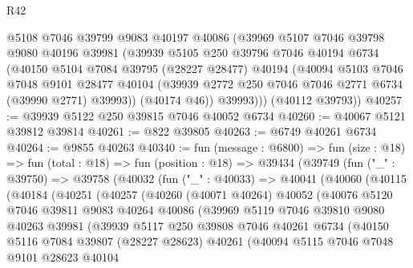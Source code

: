 \begin{lexlean}{R42}
\begin{coremodule}
{        @5108
        @7046
        @39799
        @9083
        @40197
        @40086
        (@39969
          @5107
          @7046
          @39798
          @9080
          @40196
          @39981
          (@39939
            @5105
            @250
            @39796
            @7046
            @40194
            @6734
            (@40150
              @5104
              @7084
              @39795
              (@28227 @28477)
              @40194
              (@40094
                @5103
                @7046
                @7048
                @9101
                @28477
                @40104
                (@39939 @2772 @250 @7046 @7046 @2771 @6734 (@39990 @2771) @39993))
              (@40174 @46))
            @39993)))
      (@40112 @39793))
@40257 := @39939 @5122 @250 @39815 @7046 @40052 @6734
@40260 := @40067 @5121 @39812 @39814
@40261 := @822 @39805
@40263 := @6749 @40261 @6734
@40264 := @9855 @40263
@40340 := fun (message : @6800) =>
  fun (size : @18) =>
  fun (total : @18) =>
  fun (position : @18) =>
  @39434
    (@39749
      (fun ("_" : @39750) =>
      @39758
        (@40032
          (fun ("_" : @40033) =>
          @40041
            (@40060
              (@40115
                (@40184
                  (@40251
                    (@40257
                      (@40260
                        (@40071 @40264)
                        @40052
                        (@40076
                          @5120
                          @7046
                          @39811
                          @9083
                          @40264
                          @40086
                          (@39969
                            @5119
                            @7046
                            @39810
                            @9080
                            @40263
                            @39981
                            (@39939
                              @5117
                              @250
                              @39808
                              @7046
                              @40261
                              @6734
                              (@40150
                                @5116
                                @7084
                                @39807
                                (@28227 @28623)
                                @40261
                                (@40094
                                  @5115
                                  @7046
                                  @7048
                                  @9101
                                  @28623
                                  @40104
}
\end{coremodule}
\end{lexlean}
